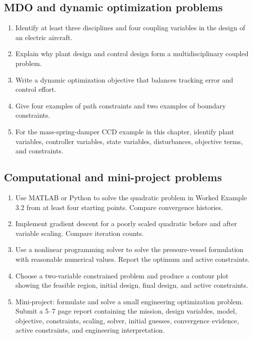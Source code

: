 \documentclass[11pt]{article}
\begin{document}
\subsection*{MDO and dynamic optimization problems}
\begin{enumerate}[leftmargin=1.5em,label=\textbf{P\arabic*.},resume]
  \item Identify at least three disciplines and four coupling variables in the design of an electric aircraft.
  \item Explain why plant design and control design form a multidisciplinary coupled problem.
  \item Write a dynamic optimization objective that balances tracking error and control effort.
  \item Give four examples of path constraints and two examples of boundary constraints.
  \item For the mass-spring-damper CCD example in this chapter, identify plant variables, controller variables, state variables, disturbances, objective terms, and constraints.
\end{enumerate}

\subsection*{Computational and mini-project problems}
\begin{enumerate}[leftmargin=1.5em,label=\textbf{P\arabic*.},resume]
  \item Use MATLAB or Python to solve the quadratic problem in Worked Example 3.2 from at least four starting points. Compare convergence histories.
  \item Implement gradient descent for a poorly scaled quadratic before and after variable scaling. Compare iteration counts.
  \item Use a nonlinear programming solver to solve the pressure-vessel formulation with reasonable numerical values. Report the optimum and active constraints.
  \item Choose a two-variable constrained problem and produce a contour plot showing the feasible region, initial design, final design, and active constraints.
  \item Mini-project: formulate and solve a small engineering optimization problem. Submit a 5--7 page report containing the mission, design variables, model, objective, constraints, scaling, solver, initial guesses, convergence evidence, active constraints, and engineering interpretation.
\end{enumerate}
\end{document}
